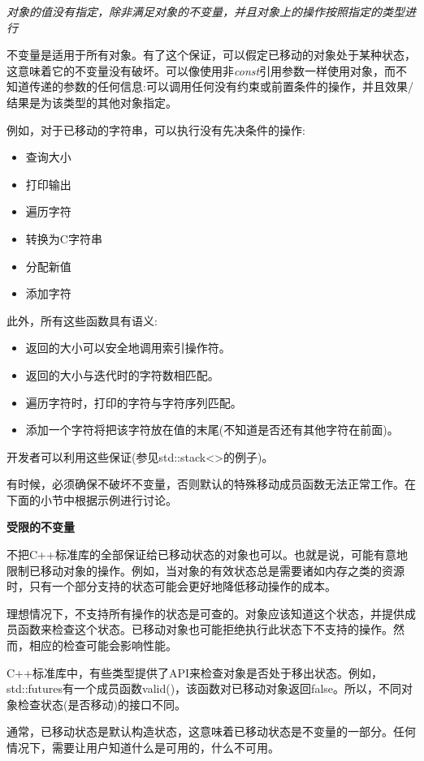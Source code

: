 \textit{对象的值没有指定，除非满足对象的不变量，并且对象上的操作按照指定的类型进行}\par

\hspace*{\fill} \par %
不变量是适用于所有对象。有了这个保证，可以假定已移动的对象处于某种状态，这意味着它的不变量没有破坏。可以像使用非\textit{const}引用参数一样使用对象，而不知道传递的参数的任何信息:可以调用任何没有约束或前置条件的操作，并且效果/结果是为该类型的其他对象指定。\par

例如，对于已移动的字符串，可以执行没有先决条件的操作:\par

\begin{itemize}
	\item 查询大小
	\item 打印输出
	\item 遍历字符
	\item 转换为C字符串
	\item 分配新值
	\item 添加字符
\end{itemize}

此外，所有这些函数具有语义:\par

\begin{itemize}
	\item 返回的大小可以安全地调用索引操作符。
	\item 返回的大小与迭代时的字符数相匹配。
	\item 遍历字符时，打印的字符与字符序列匹配。
	\item 添加一个字符将把该字符放在值的末尾(不知道是否还有其他字符在前面)。
\end{itemize}

开发者可以利用这些保证(参见std::stack<>的例子)。\par

有时候，必须确保不破坏不变量，否则默认的特殊移动成员函数无法正常工作。在下面的小节中根据示例进行讨论。\par

\hspace*{\fill} \par %
\textbf{受限的不变量}

不把C++标准库的全部保证给已移动状态的对象也可以。也就是说，可能有意地限制已移动对象的操作。例如，当对象的有效状态总是需要诸如内存之类的资源时，只有一个部分支持的状态可能会更好地降低移动操作的成本。\par

理想情况下，不支持所有操作的状态是可查的。对象应该知道这个状态，并提供成员函数来检查这个状态。已移动对象也可能拒绝执行此状态下不支持的操作。然而，相应的检查可能会影响性能。\par

C++标准库中，有些类型提供了API来检查对象是否处于移出状态。例如，std::futures有一个成员函数valid()，该函数对已移动对象返回false。所以，不同对象检查状态(是否移动)的接口不同。\par

通常，已移动状态是默认构造状态，这意味着已移动状态是不变量的一部分。任何情况下，需要让用户知道什么是可用的，什么不可用。\par




